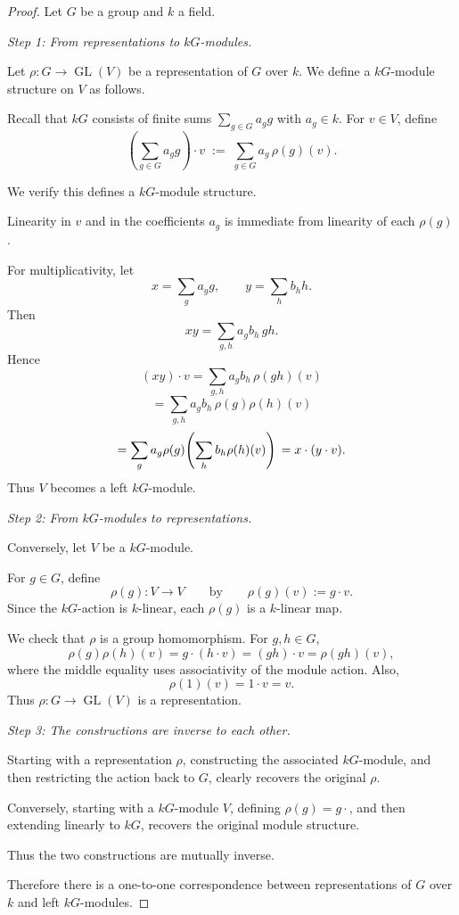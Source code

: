 \begin{proof}

    Let $G$ be a group and $k$ a field.
    
    \medskip
    
    \emph{Step 1: From representations to $kG$-modules.}
    
    Let $\rho : G \to \operatorname{GL}(V)$ be a representation of $G$ over $k$.  
    We define a $kG$-module structure on $V$ as follows.
    
    Recall that $kG$ consists of finite sums $\sum_{g \in G} a_g g$ with $a_g \in k$.  
    For $v \in V$, define
    $$
    \left( \sum_{g \in G} a_g g \right)\cdot v
    \;:=\;
    \sum_{g \in G} a_g \, \rho(g)(v).
    $$
    
    We verify this defines a $kG$-module structure.
    
    Linearity in $v$ and in the coefficients $a_g$ is immediate from linearity of each $\rho(g)$.  
    
    For multiplicativity, let
    $$
    x = \sum_g a_g g, 
    \qquad
    y = \sum_h b_h h.
    $$
    Then
    $$
    xy = \sum_{g,h} a_g b_h \, gh.
    $$
    Hence
$$ 
    (xy) \cdot v
    =
    \sum_{g,h} a_g b_h \, \rho(gh)(v)
    $$
    $$
    =
    \sum_{g,h} a_g b_h \, \rho(g)\rho(h)(v) 
$$
$$
    =
    \sum_g a_g \rho(g)\!\left( \sum_h b_h \rho(h)(v) \right) \\
    =
    x \cdot (y \cdot v).
    $$
    Thus $V$ becomes a left $kG$-module.
    
    
    \emph{Step 2: From $kG$-modules to representations.}
    
    Conversely, let $V$ be a $kG$-module.
    
    For $g \in G$, define
    $$
    \rho(g) : V \to V
    \qquad \text{by} \qquad
    \rho(g)(v) := g \cdot v.
    $$
    Since the $kG$-action is $k$-linear, each $\rho(g)$ is a $k$-linear map.
    
    We check that $\rho$ is a group homomorphism. For $g,h \in G$,
    $$
    \rho(g)\rho(h)(v)
    =
    g \cdot (h \cdot v)
    =
    (gh) \cdot v
    =
    \rho(gh)(v),
    $$
    where the middle equality uses associativity of the module action. Also,
    $$
    \rho(1)(v) = 1 \cdot v = v.
    $$
    Thus $\rho : G \to \operatorname{GL}(V)$ is a representation.
    
    
    \emph{Step 3: The constructions are inverse to each other.}
    
    Starting with a representation $\rho$, constructing the associated $kG$-module, and then restricting the action back to $G$, clearly recovers the original $\rho$.
    
    Conversely, starting with a $kG$-module $V$, defining $\rho(g)=g\cdot$, and then extending linearly to $kG$, recovers the original module structure.
    
    Thus the two constructions are mutually inverse.
    
    
    Therefore there is a one-to-one correspondence between representations of $G$ over $k$ and left $kG$-modules.
\end{proof}
